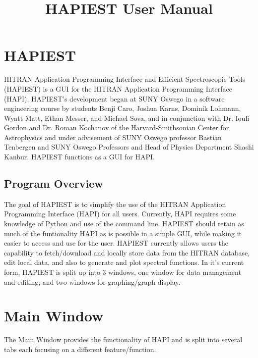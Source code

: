 \documentclass[12pt]{article}
\begin{document}
\title{HAPIEST User Manual} 
\date{}
\maketitle
\thispagestyle{empty}
\newpage

\tableofcontents
\thispagestyle{empty}
\newpage

\setcounter{page}{1}
\section{HAPIEST}
HITRAN Application Programming Interface and Efficient Spectroscopic Tools (HAPIEST) is a GUI for the HITRAN Application Programming Interface (HAPI). HAPIEST's development began at SUNY Oswego in a software engineering course by students Benji Caro, Joshua Karns, Dominik Lohmann, Wyatt Matt, Ethan Messer, and Michael Sova, and in conjunction with Dr. Iouli Gordon and Dr. Roman Kochanov of the Harvard-Smithsonian Center for Astrophysics and under advisement of SUNY Oswego professor Bastian Tenbergen and SUNY Oswego Professors and Head of Physics Department Shashi Kanbur. HAPIEST functions as a GUI for HAPI.
\subsection{Program Overview}
The goal of HAPIEST is to simplify the use of the HITRAN Application Programming Interface (HAPI) for all users. Currently, HAPI requires some knowledge of Python and use of the command line. HAPIEST should retain as much of the funtionality HAPI as is possible in a simple GUI, while making it easier to access and use for the user. HAPIEST currently allows users the capability to fetch/download and locally store data from the HITRAN database, edit local data, and also to generate and plot spectral functions. In it's current form, HAPIEST is split up into 3 windows, one window for data management and editing, and two windows for graphing/graph display.

\section{Main Window}
The Main Window provides the functionality of HAPI and is split into several tabs each focusing on a different feature/function. 
\end{document}
